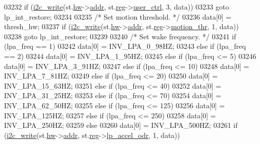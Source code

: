 \begin{DoxyCode}
03232         \textcolor{keywordflow}{if} (\hyperlink{_i2_c_8c_ac0f145afe8d662af199043939f4398d6}{i2c\_write}(st.\hyperlink{structgyro__state__s_a5bac30a96752691e4cc723735060e360}{hw}->\hyperlink{structhw__s_a4c34a946600e9d68b6355d23f54d291b}{addr}, st.\hyperlink{structgyro__state__s_ae857e1285c583b7438a208edd691a38e}{reg}->\hyperlink{structgyro__reg__s_ad8384710853dc1f9580b9ff19e87efbc}{user\_ctrl}, 3, data))
03233             \textcolor{keywordflow}{goto} lp\_int\_restore;
03234 
03235         \textcolor{comment}{/* Set motion threshold. */}
03236         data[0] = thresh\_hw;
03237         \textcolor{keywordflow}{if} (\hyperlink{_i2_c_8c_ac0f145afe8d662af199043939f4398d6}{i2c\_write}(st.\hyperlink{structgyro__state__s_a5bac30a96752691e4cc723735060e360}{hw}->\hyperlink{structhw__s_a4c34a946600e9d68b6355d23f54d291b}{addr}, st.\hyperlink{structgyro__state__s_ae857e1285c583b7438a208edd691a38e}{reg}->\hyperlink{structgyro__reg__s_a31322df7c5727b98480d1fcb18e040c5}{motion\_thr}, 1, data))
03238             \textcolor{keywordflow}{goto} lp\_int\_restore;
03239 
03240         \textcolor{comment}{/* Set wake frequency. */}
03241         \textcolor{keywordflow}{if} (lpa\_freq == 1)
03242             data[0] = INV\_LPA\_0\_98HZ;
03243         \textcolor{keywordflow}{else} \textcolor{keywordflow}{if} (lpa\_freq == 2)
03244             data[0] = INV\_LPA\_1\_95HZ;
03245         \textcolor{keywordflow}{else} \textcolor{keywordflow}{if} (lpa\_freq <= 5)
03246             data[0] = INV\_LPA\_3\_91HZ;
03247         \textcolor{keywordflow}{else} \textcolor{keywordflow}{if} (lpa\_freq <= 10)
03248             data[0] = INV\_LPA\_7\_81HZ;
03249         \textcolor{keywordflow}{else} \textcolor{keywordflow}{if} (lpa\_freq <= 20)
03250             data[0] = INV\_LPA\_15\_63HZ;
03251         \textcolor{keywordflow}{else} \textcolor{keywordflow}{if} (lpa\_freq <= 40)
03252             data[0] = INV\_LPA\_31\_25HZ;
03253         \textcolor{keywordflow}{else} \textcolor{keywordflow}{if} (lpa\_freq <= 70)
03254             data[0] = INV\_LPA\_62\_50HZ;
03255         \textcolor{keywordflow}{else} \textcolor{keywordflow}{if} (lpa\_freq <= 125)
03256             data[0] = INV\_LPA\_125HZ;
03257         \textcolor{keywordflow}{else} \textcolor{keywordflow}{if} (lpa\_freq <= 250)
03258             data[0] = INV\_LPA\_250HZ;
03259         \textcolor{keywordflow}{else}
03260             data[0] = INV\_LPA\_500HZ;
03261         \textcolor{keywordflow}{if} (\hyperlink{_i2_c_8c_ac0f145afe8d662af199043939f4398d6}{i2c\_write}(st.\hyperlink{structgyro__state__s_a5bac30a96752691e4cc723735060e360}{hw}->\hyperlink{structhw__s_a4c34a946600e9d68b6355d23f54d291b}{addr}, st.\hyperlink{structgyro__state__s_ae857e1285c583b7438a208edd691a38e}{reg}->\hyperlink{structgyro__reg__s_a14a0bff136c827f3f58f619f8045788b}{lp\_accel\_odr}, 1, data))

\end{DoxyCode}
